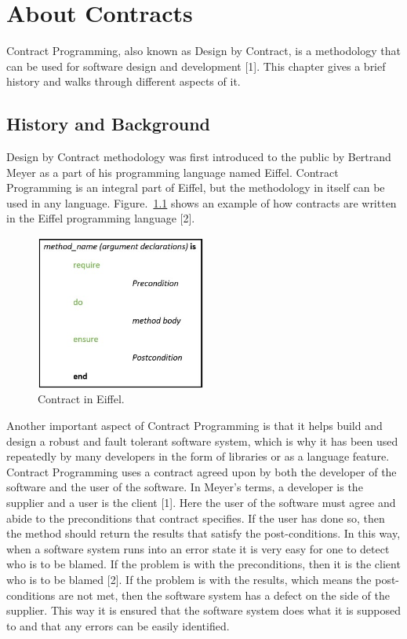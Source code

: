 \chapter{About Contracts}

Contract Programming, also known as Design by Contract, is a methodology that can be used for software design and development [1]. This chapter gives a brief history and walks through different aspects of it.

\section{History and Background}

Design by Contract methodology was first introduced to the public by Bertrand Meyer as a part of his programming language named Eiffel. Contract Programming is an integral part of Eiffel, but the methodology in itself can be used in any language. Figure.~\ref{fig:EiffelContract} shows an example of how contracts are written in the Eiffel programming language [2].

\begin{figure}[htb]
\centering
\includegraphics[width=0.5\textwidth]{images/EiffelContract.jpg}
\caption{Contract in Eiffel.} 
\label{fig:EiffelContract}
\end{figure}

Another important aspect of Contract Programming is that it helps build and design a robust and fault tolerant software system, which is why it has been used repeatedly by many developers in the form of libraries or as a language feature.
Contract Programming uses a contract agreed upon by both the developer of the software and the user of the software. In Meyer's terms, a developer is the supplier and a user is the client [1].  
Here the user of the software must agree and abide to the preconditions that contract specifies. If the user has done so, then the method should return the results that satisfy the post-conditions. In this way, when a software system runs into an error state it is very easy for one to detect who is to be blamed. If the problem is with the preconditions, then it is the client who is to be blamed [2]. If the problem is with the results, which means the post-conditions are not met, then the software system has a defect on the side of the supplier. This way it is ensured that the software system does what it is supposed to and that any errors can be easily identified.

